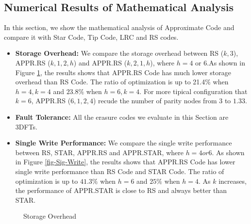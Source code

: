 \documentclass[sigconf]{acmart}
\begin{document}
\subsection{Numerical Results of Mathematical Analysis}
In this section, we show the mathematical analysis of Approximate Code and compare it with Star Code, Tip Code, LRC and RS codes.
\begin{itemize}
    \item \textbf{Storage Overhead:} We compare the storage overhead between RS ($k,3$), APPR.RS ($k,1,2,h$) and APPR.RS ($k,2,1,h$), where $h = 4$ or $6$.As shown in Figure \ref{fig-Storage}, the results shows that APPR.RS Code has much lower storage overhead than RS Code. The ratio of optimization is up to 21.4\% when $h=4, k=4$ and $23.8\%$ when $h=6, k=4$. For more tipical configuration that $k=6$, APPR.RS ($6,1,2,4$) recude the number of parity nodes from $3$ to $1.33$.
    \item \textbf{Fault Tolerance:} All the erasure codes we evaluate in this Section are 3DFTs.
    \item \textbf{Single Write Performance:} We compare the single write performance between RS, STAR, APPR.RS and APPR.STAR, where $h = 4 or 6$. As shown in Figure \ref{fig-Sig-Write}, the results shows that APPR.RS Code has lower single write performance than RS Code and STAR Code. The ratio of optimization is up to $41.3\%$ when $h=6$ and $25\%$ when $h=4$. As $k$ increases, the performance of APPR.STAR is close to RS and always better than STAR.
\end{itemize}

\begin{figure}[ht]
\caption{Storage Overhead}\label{fig-Storage}
\end{figure}
\end{document}
